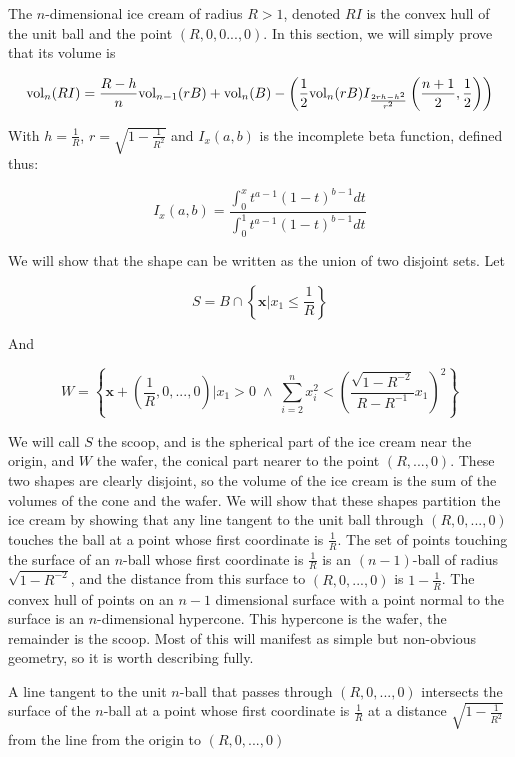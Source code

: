 The $n$-dimensional ice cream of radius $R>1$, denoted $RI$ is the convex hull of the unit ball and the point $(R,0,0...,0)$. In this section, we will simply prove that its volume is

$$
\mbox{vol}_n(RI) = \frac{R-h}{n} \mbox{vol}_{n-1}(rB) + \mbox{vol}_n(B) - \left(\frac{1}{2}\mbox{vol}_n(rB) I_{\frac{2rh-h^2}{r^2}}\left(\frac{n+1}{2}, \frac{1}{2}\right)\right)
$$

With $h = \frac{1}{R}$, $r = \sqrt{1-\frac{1}{R^2}}$ and $I_x(a,b)$ is the incomplete beta function, defined thus:

$$
I_x(a,b) = \frac{\int^x_0 t^{a-1}(1-t)^{b-1}dt}{\int^1_0 t^{a-1}(1-t)^{b-1} dt}
$$

We will show that the shape can be written as the union of two disjoint sets. Let

$$
S = B \cap \left\{{\bm x} | x_1 \leqslant \frac{1}{R}\right\}
$$

And

$$
W = \left\{{\bm x} + \left(\frac{1}{R}, 0, ..., 0\right) | x_1 > 0 \; \wedge \; \sum^{n}_{i=2} x_i^2 < \left(\frac{\sqrt{1-R^{-2}}}{R-R^{-1}} x_1\right)^2 \right\}
$$

We will call $S$ the scoop, and is the spherical part of the ice cream near the origin, and $W$ the wafer, the conical part nearer to the point $(R,...,0)$. These two shapes are clearly disjoint, so the volume of the ice cream is the sum of the volumes of the cone and the wafer. We will show that these shapes partition the ice cream by showing that any line tangent to the unit ball through $(R,0,...,0)$ touches the ball at a point whose first coordinate is $\frac{1}{R}$.  The set of points touching the surface of an $n$-ball whose first coordinate is $\frac{1}{R}$ is an $(n-1)$-ball of radius $\sqrt{1-R^{-2}}$, and the distance from this surface to $(R,0,...,0)$ is $1-\frac{1}{R}$. The convex hull of points on an $n-1$ dimensional surface with a point normal to the surface is an $n$-dimensional hypercone. This hypercone is the wafer, the remainder is the scoop. Most of this will manifest as simple but non-obvious geometry, so it is worth describing fully.

\begin{proposition}
A line tangent to the unit $n$-ball that passes through $(R,0,...,0)$ intersects the surface of the $n$-ball at a point whose first coordinate is $\frac{1}{R}$ at a distance $\sqrt{1-\frac{1}{R^2}}$ from the line from the origin to $(R,0,...,0)$
\end{proposition}

